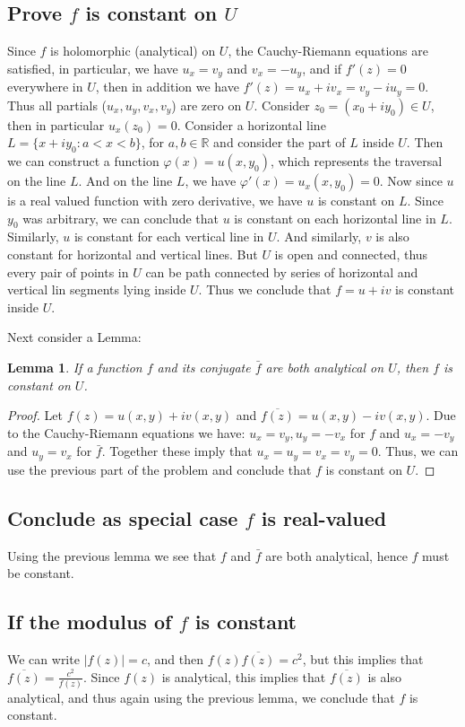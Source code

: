 \documentclass{article}[12pt]
\newtheorem{lem}{Lemma}
\newtheorem{proof}{Proof}
\def\phi{\varphi}
\def\RR{\mathbb R}
\begin{document}
\subsection{Prove $f$ is constant on $U$}
Since $f$ is holomorphic (analytical) on $U$, the Cauchy-Riemann
equations are satisfied, in particular, we have
$u_x=v_y$ and $v_x=-u_y$, and if $f'(z)=0$ everywhere in $U$, then
in addition we have $f'(z)=u_x+iv_x = v_y-iu_y=0$.
Thus all partials ($u_x,u_y,v_x,v_y$) are zero on $U$.
Consider $z_0=(x_0+iy_0)\in U$, then in particular $u_x(z_0)=0$.
Consider a horizontal line $L=\{x+iy_0:a<x<b\}$, for $a,b\in\RR$ and
consider the part of $L$ inside $U$. Then we can construct a function
$\phi(x)=u(x,y_0)$, which represents the traversal on the line $L$. And
on the line $L$, we have $\phi'(x)=u_x(x,y_0)=0$. Now since $u$ is a real
valued function with zero derivative, we have $u$ is constant on $L$.
Since $y_0$ was arbitrary, we can conclude that $u$ is constant on each
horizontal line in $L$. Similarly, $u$ is constant for each vertical line
in $U$. And similarly, $v$ is also constant for horizontal and vertical lines.
But $U$ is open and connected, thus every pair of points in $U$ can be
path connected by series of horizontal and vertical lin segments lying
inside $U$. Thus we conclude that $f=u+iv$ is constant inside $U$.

Next consider a Lemma:
\begin{lem}
If a function $f$ and its conjugate $\bar{f}$ are both analytical
on $U$, then $f$ is constant on $U$.
\end{lem}
\begin{proof}
Let $f(z)=u(x,y)+iv(x,y)$ and $\overline{f(z)}=u(x,y)-iv(x,y)$. 
Due to the Cauchy-Riemann
equations we have: $u_x=v_y, u_y=-v_x$ for $f$ and
$u_x=-v_y$ and $u_y=v_x$ for $\bar{f}$. Together these imply that
$u_x=u_y=v_x=v_y=0$. Thus, we can use the previous part of the
problem and conclude that $f$ is constant on $U$.
\end{proof}
\subsection{Conclude as special case $f$ is real-valued}
Using the previous lemma we see that $f$ and $\bar{f}$ are both
analytical, hence $f$ must be constant.

\subsection{If the modulus of $f$ is constant}
We can write $|f(z)|=c$, and then $f(z)\overline{f(z)}=c^2$, but
this implies that $\overline{f(z)}=\frac{c^2}{f(z)}$. Since $f(z)$
is analytical, this implies that $\overline{f(z)}$ is also analytical, and
thus again using the previous lemma, we conclude that $f$ is constant.
\end{document}
